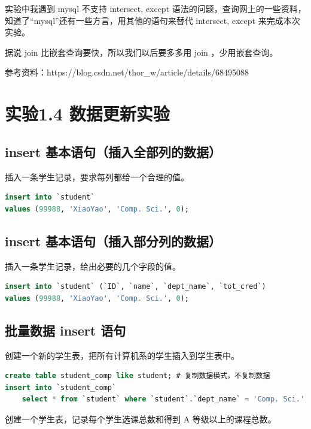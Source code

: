 \documentclass{article}
\begin{document}
实验中我遇到 mysql 不支持 intersect, except 语法的问题，查询网上的一些资料，知道了“mysql”还有一些方言，用其他的语句来替代 intersect, except 来完成本次实验。

据说 join 比嵌套查询要快，所以我们以后要多多用 join ，少用嵌套查询。

参考资料：https://blog.csdn.net/thor\_w/article/details/68495088

\section{实验1.4 数据更新实验}

\subsection{insert 基本语句（插入全部列的数据）}

插入一条学生记录，要求每列都给一个合理的值。

\begin{lstlisting}[language=sql]
insert into `student`
values (99988, 'XiaoYao', 'Comp. Sci.', 0);
\end{lstlisting}

\subsection{insert 基本语句（插入部分列的数据）}

插入一条学生记录，给出必要的几个字段的值。

\begin{lstlisting}[language=sql]
insert into `student` (`ID`, `name`, `dept_name`, `tot_cred`)
values (99988, 'XiaoYao', 'Comp. Sci.', 0);
\end{lstlisting}

\subsection{批量数据 insert 语句}

创建一个新的学生表，把所有计算机系的学生插入到学生表中。

\begin{lstlisting}[language=sql]
create table student_comp like student; # 复制数据模式，不复制数据
insert into `student_comp`
	select * from `student` where `student`.`dept_name` = 'Comp. Sci.';
\end{lstlisting}

创建一个学生表，记录每个学生选课总数和得到 A 等级以上的课程总数。
\end{document}
